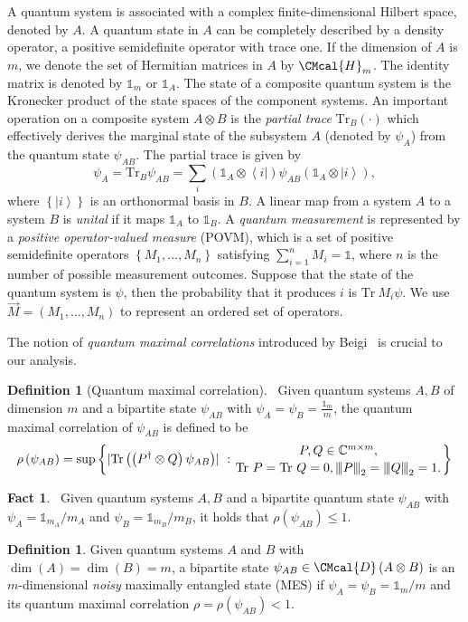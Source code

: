 \documentclass[11pt]{article}
\def\D{\CMcal{D}}
\def\H{\CMcal{H}}
\theoremstyle{plain}
\theoremstyle{definition}
\newtheorem{definition}[theorem]{Definition}
\newtheorem{fact}[theorem]{Fact}
\newcommand {\set} [1] {\ensuremath{ \left\lbrace #1 \right\rbrace }}
\newcommand {\br} [1] {\ensuremath{ \left( #1 \right) }}
\DeclarePairedDelimiter{\abs}{\lvert}{\rvert}
\newcommand {\bra} [1] {\ensuremath{ \left\langle #1 \right| }}
\newcommand {\ket} [1] {\ensuremath{ \left| #1 \right\rangle }}
\newcommand{\nnorm}[1]{{\left\vert\kern-0.25ex\left\vert\kern-0.25ex\left\vert #1
		\right\vert\kern-0.25ex\right\vert\kern-0.25ex\right\vert}}
\newcommand {\Tr} {\ensuremath{ \mathrm{Tr} }}
\newcommand {\id} {\ensuremath{\mathds{1}}}
\renewcommand{\vec}[1]{\stackrel{\longrightarrow}{#1}}
\newcommand{\1}{\mathbb{1}} %
\begin{document}
A quantum system is associated with a complex finite-dimensional Hilbert space, denoted by $A$. A quantum state in $A$ can be completely described by a density operator, a positive semidefinite operator with trace one. If the dimension of $A$ is $m$, we denote the set of Hermitian matrices in $A$ by $\H_m$. The identity matrix is denoted by $\id_m$ or $\id_A$. The state of a composite quantum system is the Kronecker product of the state spaces of the component systems. An important operation on a composite system $A\otimes B$ is the {\em partial trace} $\Tr_B\br{\cdot}$ which effectively derives the marginal state of the subsystem $A$ (denoted by $\psi_A$) from the quantum state $\psi_{AB}$.  The partial trace is given by \[\psi_A=\Tr_B\psi_{AB}=\sum_i\br{\id_A\otimes\bra{i}}\psi_{AB}\br{\id_A\otimes\ket{i}},\] where $\set{\ket{i}}$ is an orthonormal basis in $B$. A linear map from a system $A$ to a system $B$ is {\em unital} if it maps $\id_A$ to $\id_B$.  A {\em quantum measurement} is represented by a {\em positive operator-valued measure} (POVM), which is a set of positive semidefinite operators $\set{M_1,\ldots, M_n}$ satisfying $\sum_{i=1}^nM_i=\id$, where $n$ is the number of possible measurement outcomes. Suppose that the state of the quantum system is $\psi$, then the probability that it produces $i$ is $\Tr~ M_i\psi$. We use $\vec{M}=\br{M_1,\ldots, M_n}$ to represent an ordered set of operators.


The notion of {\em quantum maximal correlations} introduced by Beigi~\cite{Beigi:2013} is crucial to our analysis. 
\begin{definition}[Quantum maximal correlation]~\cite{Beigi:2013}\label{def:maximalcorrelation}
	Given quantum systems $A, B$ of dimension $m$ and a bipartite state $\psi_{AB}$ with $\psi_A=\psi_B=\frac{\id_{m}}{m}$, the quantum maximal correlation of $\psi_{AB}$ is defined to be
	\[\rho\br{\psi_{AB}}=\sup\set{\abs{\Tr\br{\br{P^{\dagger}\otimes Q}\psi_{AB}}}~:\genfrac{}{}{0pt}{}{P, Q\in\mathbb{C}^{m\times m},}{\Tr~P=\Tr~Q=0, \nnorm{P}_2=\nnorm{Q}_2=1.}}\]
\end{definition}



\begin{fact}~\cite{Beigi:2013}\label{fac:maximalcorrlationone}
	Given quantum systems $A, B$ and a bipartite quantum state $\psi_{AB}$ with $\psi_A=\id_{m_A}/m_A$ and $\psi_B=\id_{m_B}/m_B$, it holds that $\rho\br{\psi_{AB}}\leq 1$.
	\end{fact}
	
	\begin{definition}\label{def:noisyepr}
		Given quantum systems $A$ and $B$ with $\dim\br{A}=\dim\br{B}=m$, a bipartite state $\psi_{AB}\in\D\br{A\otimes B}$ is an $m$-dimensional \emph{noisy} maximally entangled state (MES) if $\psi_A=\psi_B=\id_m/m$ and its quantum maximal correlation $\rho=\rho\br{\psi_{AB}}<1$.
	\end{definition}
\end{document}
